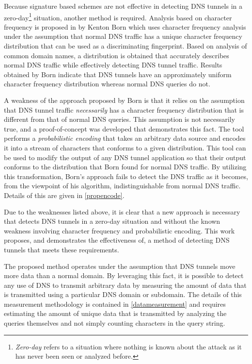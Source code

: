 \documentclass[12pt]{article}
\theoremstyle{remark}
\theoremstyle{definition}
\theoremstyle{definition}
\theoremstyle{definition}
\begin{document}
Because signature based schemes are not effective in detecting DNS tunnels in a
zero-day\footnote{\emph{Zero-day} refers to a situation where nothing is
known about the attack as it has never been seen or analyzed before.} situation, another
method is required. Analysis based on character frequency is proposed
in\cite{kenton.born.frequency} by Kenton Born which uses character
frequency analysis under the assumption that normal DNS traffic has a unique
character frequency distribution that can be used as a discriminating fingerprint. Based on analysis of common domain names, a
distribution is obtained that accurately describes normal DNS traffic while
effectively detecting DNS tunnel traffic. Results obtained by Born indicate
that DNS tunnels have an approximately uniform character frequency distribution whereas normal DNS queries do not.

A weakness of the approach proposed by Born is that it relies on the assumption
that DNS tunnel traffic \emph{necessarily} has a character frequency
distribution that is different from that of normal DNS queries. This assumption is not necessarily true, and a proof-of-concept
was developed that demonstrates this fact. The tool performs a
\emph{probabilistic encoding} that takes an arbitrary data source and encodes
it into a stream of characters that conforms to a given distribution. This tool
can be used to modify the output of any DNS tunnel application so that their
output conforms to the distribution that Born found for normal DNS traffic. By
utilizing this transformation, Born's approach fails to detect the DNS traffic
as it becomes, from the viewpoint of his algorithm, indistinguishable from
normal DNS traffic. Details of this are given in \ref{propencode}.

Due to the weaknesses listed above, it is clear that a new approach is
necessary that detects DNS tunnels in a zero-day situation and without the known
weakness involving character frequency and probabilistic encoding. This work
proposes, and demonstrates the effectiveness of, a method of detecting DNS
tunnels that meets these requirements.

The proposed method operates under the assumption that DNS tunnels move more
data than a normal domain. By leveraging this fact, it is possible to detect
any use of DNS to transmit arbitrary data by measuring the amount of data that
is transmitted using a particular DNS domain or subdomain. The details of this
measurement methodology is contained in \ref{datameasurement} and requires
estimating the amount of unique data that is transmitted by analyzing the
queries themselves and not simply counting characters in the query string.
\end{document}
